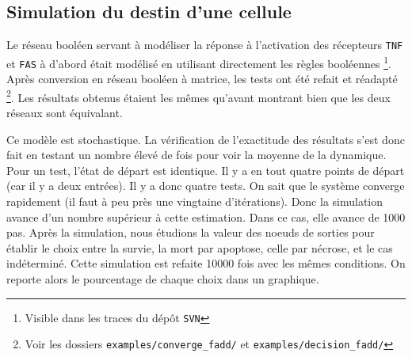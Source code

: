 \documentclass[11pt, a4paper]{article}
\begin{document}
\subsection{Simulation du destin d'une cellule}
Le réseau booléen servant à modéliser la réponse à l'activation des récepteurs
\texttt{TNF} et \texttt{FAS} à d'abord était modélisé en utilisant directement
les règles booléennes \footnote{Visible dans les traces du dépôt \texttt{SVN}}.
Après conversion en réseau booléen à matrice, les tests ont été refait et
réadapté \footnote{Voir les dossiers \texttt{examples/converge\_fadd/} et
\texttt{examples/decision\_fadd/}}. Les résultats obtenus étaient les mêmes
qu'avant montrant bien que les deux réseaux sont équivalant.

Ce modèle est stochastique. La vérification de l'exactitude des résultats s'est
donc fait en testant un nombre élevé de fois pour voir la moyenne de la
dynamique. Pour un test, l'état de départ est identique. Il y a en tout quatre
points de départ (car il y a deux entrées). Il y a donc quatre tests. On sait
que le système converge rapidement (il faut à peu près une vingtaine
d'itérations). Donc la simulation avance d'un nombre supérieur à cette
estimation. Dans ce cas, elle avance de 1000 pas. Après la simulation, nous
étudions la valeur des noeuds de sorties pour établir le choix entre la survie,
la mort par apoptose, celle par nécrose, et le cas indéterminé. Cette
simulation est refaite 10000 fois avec les mêmes conditions. On reporte alors
le pourcentage de chaque choix dans un graphique.
\end{document}
